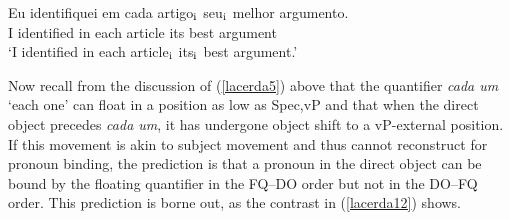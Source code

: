 \documentclass[output=paper]{langscibook}
\begin{document}
\begin{exe}
\ex \label{lacerda10}
\begin{xlist}

\end{xlist}

\ex \label{lacerda11}
\gll Eu 	identifiquei 	em	cada 	artigo$_{\textnormal{i}}$ 	seu$_{\textnormal{i}}$	melhor 	argumento.\\
I 	identified	in	each 	article 	its 	best	argument\\
\glt‘I identified in each article$_{\textnormal{i}}$ its$_{\textnormal{i}}$ best argument.’
\end{exe}

Now recall from the discussion of (\ref{lacerda5}) above that the quantifier \emph{cada um} ‘each one’ can float in a position as low as Spec,vP and that when the direct object precedes \emph{cada um}, it has undergone object shift to a vP-external position. If this movement is akin to subject movement and thus cannot reconstruct for pronoun binding, the prediction is that a pronoun in the direct object can be bound by the floating quantifier in the FQ--DO order but not in the DO--FQ order. This prediction is borne out, as the contrast in (\ref{lacerda12}) shows. 

\begin{exe}
\ex \label{lacerda12}
\begin{xlist}

\end{xlist}
\end{exe}
\end{document}
